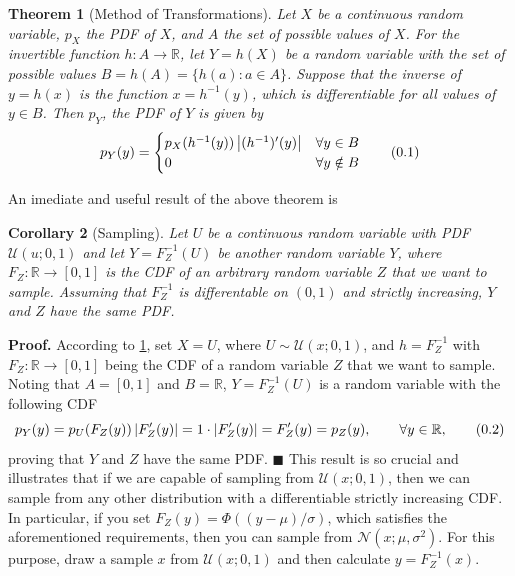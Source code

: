 \documentclass[10pt]{article}
\newtheorem{thm}{Theorem}[section]
\newtheorem{cor}[thm]{Corollary}
\theoremstyle{definition}
\theoremstyle{definition}
\theoremstyle{remark}
\newenvironment{prf}{\noindent\textbf{Proof.}}{\hfill$\blacksquare$}
\newcommand\eqnum{\addtocounter{equation}{1}\tag{\arabic{section}.\arabic{equation}}}
\begin{document}
\begin{thm}[Method of Transformations]\label{thm:MT}
Let $X$ be a continuous random variable, $p_X$ the PDF of $X$, and $A$ the set of possible values of $X$. For the invertible function $h:A\to\mathbb{R}$, let $Y=h(X)$ be a random variable with the set of possible values $B=h(A)=\{h(a): a\in A\}$. Suppose that the inverse of $y=h(x)$ is the function $x=h^{-1}(y)$, which is differentiable for all values of $y\in B$. Then $p_Y$, the PDF of $Y$ is given by
\begin{equation*}
p_Y(y) = 
\begin{cases}
p_X(h^{-1}(y))\left|(h^{-1})'(y)\right| & \forall y \in B  \\
0 & \forall y \notin B 
\end{cases}
\eqnum
\end{equation*}
\end{thm}
\noindent
An imediate and useful result of the above theorem is
\begin{cor}[Sampling]\label{thm:sample}
Let $U$ be a continuous random variable with PDF $\mathcal{U}(u; 0, 1)$ and let $Y=F_Z^{-1}(U)$ be another random variable $Y$, where $F_Z:\mathbb{R}\to[0,1]$ is the CDF of an arbitrary random variable $Z$ that we want to sample. Assuming that $F_Z^{-1}$ is differentable on $(0, 1)$ and strictly increasing, $Y$ and $Z$ have the same PDF.
\end{cor}
\begin{prf}
According to \cref{thm:MT}, set $X=U$, where $U\sim\mathcal{U}(x; 0, 1)$, and $h = F_Z^{-1}$ with $F_Z:\mathbb{R} \to [0, 1]$ being the CDF of a random variable $Z$ that we want to sample. Noting that $A=[0, 1]$ and $B=\mathbb{R}$,  $Y=F_Z^{-1}(U)$ is a random variable with the following CDF
\begin{equation*}
p_Y(y) = p_U(F_Z(y))\left|F_Z'(y)\right|=1\cdot\left|F_Z'(y)\right|= F_Z'(y)=p_Z(y),  \qquad \forall y \in \mathbb{R},
\eqnum
\end{equation*}
proving that $Y$ and $Z$ have the same PDF.
\end{prf}
\newline
This result is so crucial and illustrates that if we are capable of sampling from $\mathcal{U}(x; 0, 1)$, then we can sample from any other distribution with a differentiable strictly increasing CDF. In particular, if you set $F_Z(y) = \Phi((y-\mu)/\sigma)$, which satisfies the aforementioned requirements, then you can sample from $\mathcal{N}(x; \mu, \sigma^2)$. For this purpose, draw a sample $x$ from $\mathcal{U}(x; 0, 1)$ and then calculate $y=F_Z^{-1}(x)$.
\end{document}
